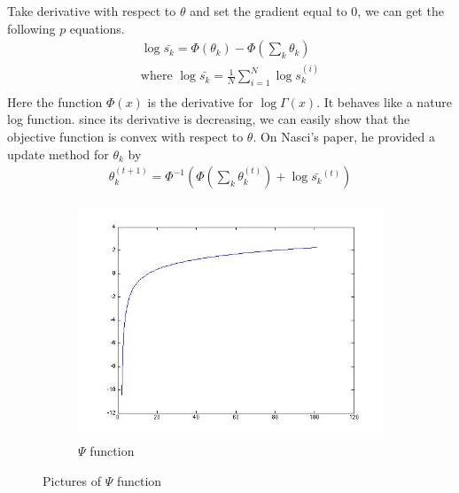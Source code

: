 \documentclass[14pt]{book}
\begin{document}
Take derivative with respect to $\theta$ and set the gradient equal to $0$, we can get the following $p$ equations. 
\begin{equation}
\begin{aligned}
\log \bar{s_k} = \Phi(\theta_k) - \Phi(\sum_k \theta_k)\\
\text{where }\log \bar{s_k}  = \frac{1}{N} \sum_{i=1}^{N} \log s_{k}^{(i)}\\
\end{aligned}
\end{equation}
Here the function $\Phi(x)$ is the derivative for $ \log \Gamma(x)$. It behaves like a nature log function. since its derivative is decreasing, we can easily show that the objective function is convex with respect to $\theta$. On Nasci's paper, he provided a update method for $\theta_k$ by 
\begin{equation}
\begin{aligned}
\theta_k^{(t+1)} =\Phi^{-1} ( \Phi(\sum_k \theta_k^{(t)}) +\log \bar{s_k}^{(t)} )\\
\end{aligned}
\end{equation}
\begin{figure}
        \centering
        \begin{subfigure}[b]{0.5\textwidth}
                \centering
                \includegraphics[width=\textwidth]{Psi.jpg}
                \caption{$\Psi$ function }
                \label{fig:psi}
        \end{subfigure}%

        \caption{Pictures of $\Psi$ function }\label{fig:animals}
\end{figure}
\end{document}
